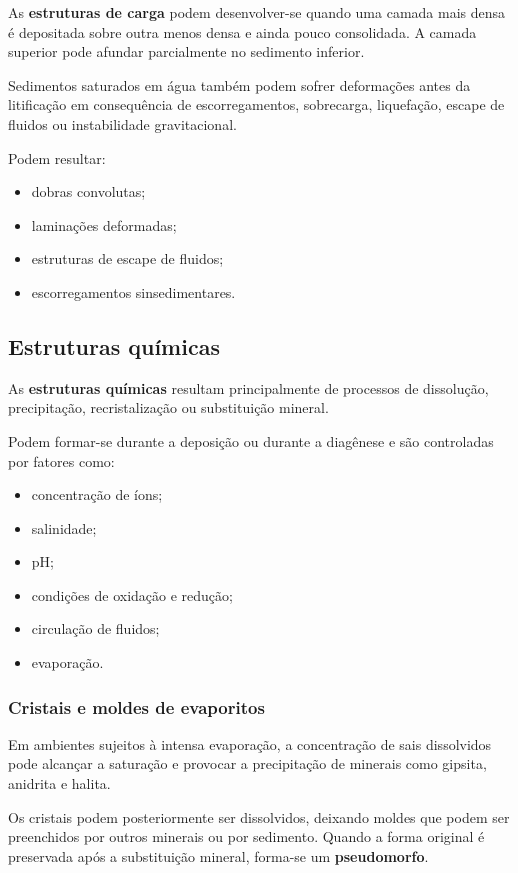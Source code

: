 \documentclass[a4paper,12pt]{article}
\theoremstyle{definition}
\theoremstyle{definition}
\theoremstyle{definition}
\begin{document}
As \textbf{estruturas de carga} podem desenvolver-se quando uma camada mais densa
é depositada sobre outra menos densa e ainda pouco consolidada. A camada
superior pode afundar parcialmente no sedimento inferior.

Sedimentos saturados em água também podem sofrer deformações antes da
litificação em consequência de escorregamentos, sobrecarga, liquefação, escape
de fluidos ou instabilidade gravitacional.

Podem resultar:

\begin{itemize}
    \item dobras convolutas;
    \item laminações deformadas;
    \item estruturas de escape de fluidos;
    \item escorregamentos sinsedimentares.
\end{itemize}

\subsection{Estruturas químicas}

As \textbf{estruturas químicas} resultam principalmente de processos de
dissolução, precipitação, recristalização ou substituição mineral.

Podem formar-se durante a deposição ou durante a diagênese e são controladas por
fatores como:

\begin{itemize}
    \item concentração de íons;
    \item salinidade;
    \item pH;
    \item condições de oxidação e redução;
    \item circulação de fluidos;
    \item evaporação.
\end{itemize}

\subsubsection{Cristais e moldes de evaporitos}

Em ambientes sujeitos à intensa evaporação, a concentração de sais dissolvidos
pode alcançar a saturação e provocar a precipitação de minerais como gipsita,
anidrita e halita.

Os cristais podem posteriormente ser dissolvidos, deixando moldes que podem ser
preenchidos por outros minerais ou por sedimento. Quando a forma original é
preservada após a substituição mineral, forma-se um \textbf{pseudomorfo}.
\end{document}
